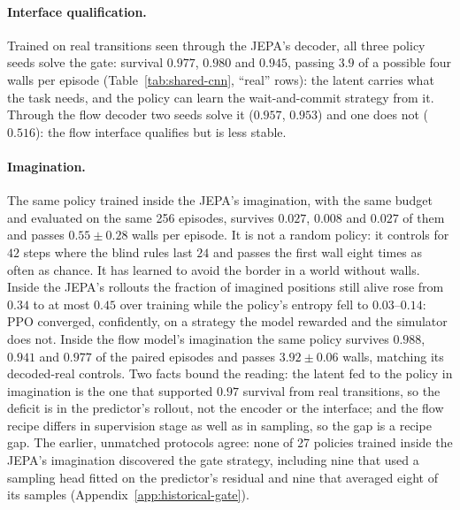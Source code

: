 \paragraph{Interface qualification.}
Trained on real transitions seen through the JEPA's decoder, all three policy seeds solve the gate:
survival $0.977$, $0.980$ and $0.945$, passing $3.9$ of a possible four walls per episode
(Table~\ref{tab:shared-cnn}, ``real'' rows): the latent carries what the task needs, and the policy
can learn the wait-and-commit strategy from it. Through the flow decoder two seeds solve it
($0.957$, $0.953$) and one does not ($0.516$): the flow interface qualifies but is less stable.

\paragraph{Imagination.}
The same policy trained inside the JEPA's imagination, with the same budget and evaluated on the
same 256 episodes, survives $0.027$, $0.008$ and $0.027$ of them and passes $0.55\pm0.28$ walls
per episode. It is not a random policy: it controls for $42$ steps where the blind rules last $24$
and passes the first wall eight times as often as chance. It has learned to avoid the border in a
world without walls. Inside the JEPA's rollouts the fraction of imagined positions still alive rose
from $0.34$ to at most $0.45$ over training while the policy's entropy fell to $0.03$--$0.14$: PPO
converged, confidently, on a strategy the model rewarded and the simulator does not. Inside the
flow model's imagination the same policy survives $0.988$, $0.941$ and $0.977$ of the paired
episodes and passes $3.92\pm0.06$ walls, matching its decoded-real controls. Two facts bound the
reading: the latent fed to the policy in imagination is the one that supported $0.97$ survival from
real transitions, so the deficit is in the predictor's rollout, not the encoder or the interface;
and the flow recipe differs in supervision stage as well as in sampling, so the gap is a recipe gap.
The earlier, unmatched protocols agree: none of 27 policies trained inside the JEPA's imagination discovered the gate
strategy, including nine that used a sampling head fitted on the predictor's residual and nine that
averaged eight of its samples (Appendix~\ref{app:historical-gate}).
